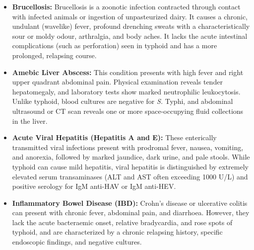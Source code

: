\begin{itemize}
\item \textbf{Brucellosis:} Brucellosis is a zoonotic infection contracted through contact with infected animals or ingestion of unpasteurized dairy. It causes a chronic, undulant (wavelike) fever, profound drenching sweats with a characteristically sour or moldy odour, arthralgia, and body aches. It lacks the acute intestinal complications (such as perforation) seen in typhoid and has a more prolonged, relapsing course.
\item \textbf{Amebic Liver Abscess:} This condition presents with high fever and right upper quadrant abdominal pain. Physical examination reveals tender hepatomegaly, and laboratory tests show marked neutrophilic leukocytosis. Unlike typhoid, blood cultures are negative for \textit{S.} Typhi, and abdominal ultrasound or CT scan reveals one or more space-occupying fluid collections in the liver.
\item \textbf{Acute Viral Hepatitis (Hepatitis A and E):} These enterically transmitted viral infections present with prodromal fever, nausea, vomiting, and anorexia, followed by marked jaundice, dark urine, and pale stools. While typhoid can cause mild hepatitis, viral hepatitis is distinguished by extremely elevated serum transaminases (ALT and AST often exceeding 1000 U/L) and positive serology for IgM anti-HAV or IgM anti-HEV.
\item \textbf{Inflammatory Bowel Disease (IBD):} Crohn's disease or ulcerative colitis can present with chronic fever, abdominal pain, and diarrhoea. However, they lack the acute bacteraemic onset, relative bradycardia, and rose spots of typhoid, and are characterized by a chronic relapsing history, specific endoscopic findings, and negative cultures.
\end{itemize}

